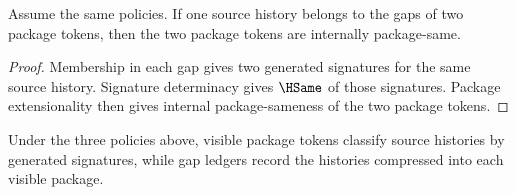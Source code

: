 \begin{theorem}
Assume the same policies.  If one source history belongs to the gaps of two package tokens, then the two package tokens are internally package-same.
\end{theorem}
\begin{proof}
Membership in each gap gives two generated signatures for the same source history.  Signature determinacy gives \(\HSame\) of those signatures.  Package extensionality then gives internal package-sameness of the two package tokens.
\end{proof}

\begin{corollary}
\label{cor:globalization-classifies-by-signatures}
Under the three policies above, visible package tokens classify source histories by generated signatures, while gap ledgers record the histories compressed into each visible package.
\end{corollary}
